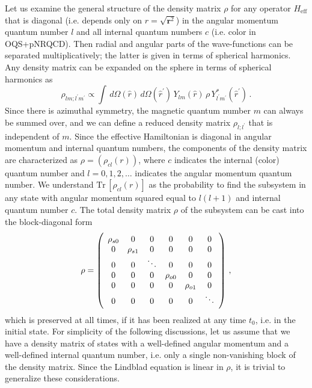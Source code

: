 \documentclass[times,sort&compress,final]{elsarticle}
\begin{document}
Let us examine the general structure of the density matrix $\rho$ for any operator $H_\text{eff}$ 
that is diagonal (i.e. depends only on $r=\sqrt{\bm{r}^2}$) in the angular momentum quantum 
number $l$  and all internal quantum numbers $c$ (i.e. color in OQS+pNRQCD). 
Then radial and angular parts of the wave-functions can be separated multiplicatively; the 
latter is given in terms of spherical harmonics. 
Any density matrix can be expanded on the sphere in terms of spherical harmonics as 
\begin{equation}
\rho_{lm;l^\prime m^\prime } \propto \int\,d\Omega(\hat{r})\,d\Omega(\hat{r}^\prime ) \, Y_{lm}^{\phantom{\ast}}(\hat{r}) \, \rho \, Y_{l^\prime m^\prime }^\ast(\hat{r}^\prime )\,.
\end{equation}
Since there is azimuthal symmetry, the magnetic quantum number $m$ can always be summed over, 
and we can define a reduced density matrix $\rho_{l;l^\prime }$ that is independent of $m$. 
Since the effective Hamiltonian is diagonal in angular momentum and internal quantum numbers, 
the components of the density matrix are characterized as $\rho = ( \rho_{cl}(r) )$, where 
$c$ indicates the internal (color) quantum number and 
$l=0,1,2,\ldots$ indicates the angular momentum quantum number.  
We understand $\mathrm{Tr}\,[\rho_{cl}(r)]$ as the probability to find the 
subsystem in any state with angular momentum squared equal to $l(l+1)$ and internal quantum 
number $c$.
The total density matrix $\rho$ of the subsystem can be cast into the block-diagonal form 
\begin{equation}
\rho=\left(\begin{array}{ccc ccc}
\rho_{s0} & 0 & 0 & 0 & 0 & 0  \\
0 & \rho_{s1} & 0 & 0 & 0 & 0 \\
0 & 0 & \ddots & 0 & 0 & 0  \\
0 & 0 & 0  & \rho_{o0} & 0 & 0  \\
0 & 0 & 0  & 0 & \rho_{o1} & 0  \\
0 & 0 & 0  & 0 & 0 &  \ddots \\
\end{array}\right)\,,
\label{eq:rhoso}
\end{equation}
which is preserved at all times, if it has been realized at any time $t_0$, i.e. in the 
initial state. 
For simplicity of the following discussions, let us assume that we have a density matrix 
of states with a well-defined angular momentum and a well-defined internal quantum number, 
i.e. only a single non-vanishing block of the density matrix. 
Since the Lindblad equation is linear in $\rho$, it is trivial to generalize these considerations. 
\end{document}
